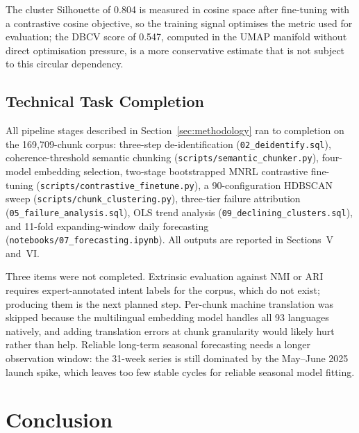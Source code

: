\documentclass[conference]{IEEEtran}
\begin{document}
The cluster Silhouette of 0.804 is measured in cosine space after fine-tuning with a contrastive cosine objective, so the training signal optimises the metric used for evaluation; the DBCV score of 0.547, computed in the UMAP manifold without direct optimisation pressure, is a more conservative estimate that is not subject to this circular dependency.

\subsection{Technical Task Completion}
\label{sec:tasks}

All pipeline stages described in Section~\ref{sec:methodology} ran to completion on the 169{,}709-chunk corpus: three-step de-identification (\texttt{02\_deidentify.sql}), coherence-threshold semantic chunking (\texttt{scripts/semantic\_chunker.py}), four-model embedding selection, two-stage bootstrapped MNRL contrastive fine-tuning (\texttt{scripts/contrastive\_finetune.py}), a 90-configuration HDBSCAN sweep (\texttt{scripts/chunk\_clustering.py}), three-tier failure attribution (\texttt{05\_failure\_analysis.sql}), OLS trend analysis (\texttt{09\_declining\_clusters.sql}), and 11-fold expanding-window daily forecasting (\texttt{notebooks/07\_forecasting.ipynb}). All outputs are reported in Sections~V and~VI.

Three items were not completed. Extrinsic evaluation against NMI or ARI requires expert-annotated intent labels for the corpus, which do not exist; producing them is the next planned step. Per-chunk machine translation was skipped because the multilingual embedding model handles all 93 languages natively, and adding translation errors at chunk granularity would likely hurt rather than help. Reliable long-term seasonal forecasting needs a longer observation window: the 31-week series is still dominated by the May--June 2025 launch spike, which leaves too few stable cycles for reliable seasonal model fitting.

\section{Conclusion}
\label{sec:conclusion}
\end{document}
